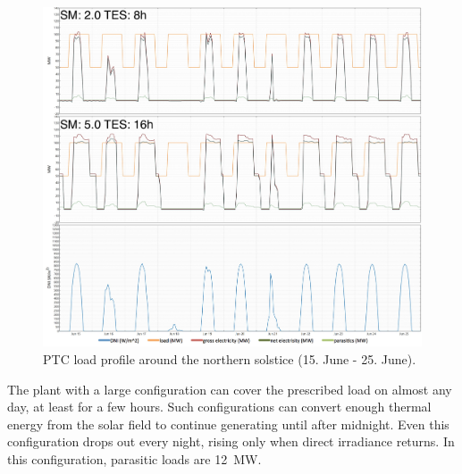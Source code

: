 \begin{figure}[htbp]  
\centering
\includegraphics[width=1\linewidth]{FIG/PTC_winter_load}
\caption[PTC load profile around the northern solstice.]{PTC load profile around the northern solstice (15. June - 25. June).}\label{PTC_winter_load}
\end{figure}

The plant with a large configuration can cover the prescribed load on almost any day, at least for a few hours. Such configurations can convert enough thermal energy from the solar field to continue generating until after midnight. Even this configuration drops out every night, rising only when direct irradiance returns. In this configuration, parasitic loads are \SI{12}{MW}. 



